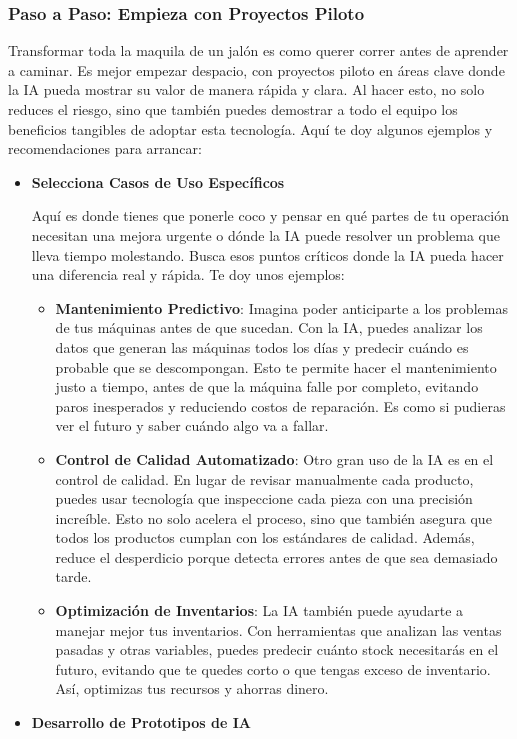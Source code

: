 \documentclass[
  10pt,
  letterpaper,
]{book}
\begin{document}
\subsubsection{\texorpdfstring{\textbf{Paso a Paso: Empieza con
Proyectos
Piloto}}{Paso a Paso: Empieza con Proyectos Piloto}}\label{paso-a-paso-empieza-con-proyectos-piloto}

Transformar toda la maquila de un jalón es como querer correr antes de
aprender a caminar. Es mejor empezar despacio, con proyectos piloto en
áreas clave donde la IA pueda mostrar su valor de manera rápida y clara.
Al hacer esto, no solo reduces el riesgo, sino que también puedes
demostrar a todo el equipo los beneficios tangibles de adoptar esta
tecnología. Aquí te doy algunos ejemplos y recomendaciones para
arrancar:

\begin{itemize}
\item
  \textbf{Selecciona Casos de Uso Específicos}

  Aquí es donde tienes que ponerle coco y pensar en qué partes de tu
  operación necesitan una mejora urgente o dónde la IA puede resolver un
  problema que lleva tiempo molestando. Busca esos puntos críticos donde
  la IA pueda hacer una diferencia real y rápida. Te doy unos ejemplos:

  \begin{itemize}
  \item
    \textbf{Mantenimiento Predictivo}: Imagina poder anticiparte a los
    problemas de tus máquinas antes de que sucedan. Con la IA, puedes
    analizar los datos que generan las máquinas todos los días y
    predecir cuándo es probable que se descompongan. Esto te permite
    hacer el mantenimiento justo a tiempo, antes de que la máquina falle
    por completo, evitando paros inesperados y reduciendo costos de
    reparación. Es como si pudieras ver el futuro y saber cuándo algo va
    a fallar.
  \item
    \textbf{Control de Calidad Automatizado}: Otro gran uso de la IA es
    en el control de calidad. En lugar de revisar manualmente cada
    producto, puedes usar tecnología que inspeccione cada pieza con una
    precisión increíble. Esto no solo acelera el proceso, sino que
    también asegura que todos los productos cumplan con los estándares
    de calidad. Además, reduce el desperdicio porque detecta errores
    antes de que sea demasiado tarde.
  \item
    \textbf{Optimización de Inventarios}: La IA también puede ayudarte a
    manejar mejor tus inventarios. Con herramientas que analizan las
    ventas pasadas y otras variables, puedes predecir cuánto stock
    necesitarás en el futuro, evitando que te quedes corto o que tengas
    exceso de inventario. Así, optimizas tus recursos y ahorras dinero.
  \end{itemize}
\item
  \textbf{Desarrollo de Prototipos de IA}


\end{itemize}
\end{document}
